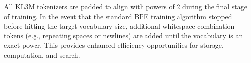 All KL3M tokenizers are padded to align with powers of 2 during the final stage of training.  In the event that the standard BPE training algorithm stopped before hitting the target vocabulary size, additional whitespace combination tokens (e.g., repeating spaces or newlines) are added until the vocabulary is an exact power.  This provides enhanced efficiency opportunities for storage, computation, and search.

%  